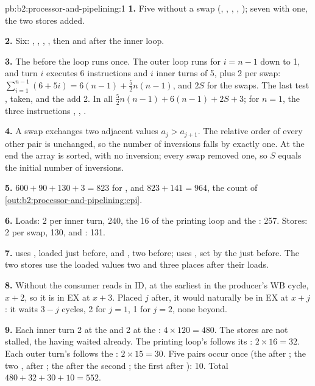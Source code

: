 \begin{solution}{pb:b2:processor-and-pipelining:1}
\textbf{1.} Five without a swap (, , , , ); seven with one, the two
stores added.

\textbf{2.} Six: , , , , then  and  after the inner loop.

\textbf{3.} The  before the loop runs once. The outer loop runs for $i = n - 1$ down to 1, and turn $i$
executes 6 instructions and $i$ inner turns of 5, plus 2 per swap: $\sum_{i=1}^{n-1} (6 + 5i) = 6(n - 1) +
\frac{5}{2}n(n-1)$, and $2S$ for the swaps. The last test , taken, and the  add 2. In all
$\frac{5}{2}n(n-1) + 6(n-1) + 2S + 3$; for $n = 1$, the three instructions , , .

\textbf{4.} A swap exchanges two adjacent values $a_j > a_{j+1}$. The relative order of every other pair is unchanged,
so the number of inversions falls by exactly one. At the end the array is sorted, with no inversion; every swap
removed one, so $S$ equals the initial number of inversions.

\textbf{5.} $600 + 90 + 130 + 3 = 823$ for , and $823 + 141 = 964$, the count of
\cref{out:b2:processor-and-pipelining:cpi}.

\textbf{6.} Loads: 2 per inner turn, 240, the 16 of the printing loop and the : 257. Stores: 2 per swap,
130, and : 131.

\textbf{7.}  uses , loaded just before, and , two before;  uses
, set by the  just before. The two stores use the loaded values two and three places after their
loads.

\textbf{8.} Without  the consumer reads in ID, at the earliest in the producer's WB cycle, $x + 2$, so it is
in EX at $x + 3$. Placed $j$ after, it would naturally be in EX at $x + j$: it waits $3 - j$ cycles, 2 for $j = 1$, 1
for $j = 2$, none beyond.

\textbf{9.} Each inner turn  2 at the  and 2 at the : $4 \times 120 = 480$. The stores are
not stalled, the  having waited already. The printing loop's  follows its : $2
\times 16 = 32$. Each outer turn's  follows the : $2 \times 15 = 30$. Five pairs
occur once (the  after ; the two ,  after ; the
 after the second ; the first  after ): 10. Total $480 + 32 +
30 + 10 = 552$.


\end{solution}
